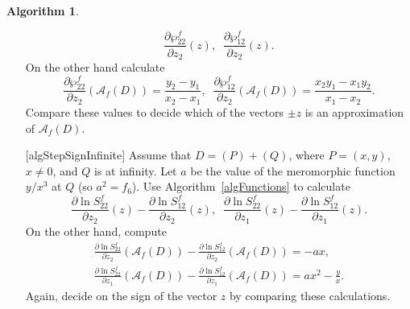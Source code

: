 \documentclass{amsart}
\numberwithin{equation}{section}
\theoremstyle{definition}
\newtheorem{algo}{Algorithm}[section]
\theoremstyle{remark}
\begin{document}
\begin{algo}
\begin{enumerate}
			\[
			\frac{\partial \wp_{22}^f}{\partial z_2}(z),\;\;\frac{\partial \wp_{12}^f}{\partial z_2}(z).
			\]
			On the other hand calculate
			\[
			\frac{\partial \wp_{22}^f}{\partial z_2}(\mathscr A_f(D)) = \frac{y_2 - y_1}{x_2 - x_1},\;\;\frac{\partial \wp_{12}^f}{\partial z_2}(\mathscr A_f(D)) = \frac{x_2 y_1 - x_1 y_2}{x_1 - x_2}.
			\]
			Compare these values to decide which of the vectors $\pm z$ is an approximation of $\mathscr A_f(D)$.
			\item[{\crtcrossreflabel{(\arabic{enumi}b)}[algStepSignInfinite]}] Assume that $D = (P) + (Q)$, where $P = (x,y)$, $x \ne 0$, and $Q$ is at infinity. Let $a$ be the value of the meromorphic function $y/x^3$ at $Q$ (so $a^2 = f_6$). Use Algorithm~\ref{algFunctions} to calculate
			\[
			\frac{\partial \ln S_{22}^f}{\partial z_2}(z) - \frac{\partial \ln S_{12}^f}{\partial z_2}(z),\;\;\frac{\partial \ln S_{22}^f}{\partial z_1}(z) - \frac{\partial \ln S_{12}^f}{\partial z_1}(z).
			\]
			On the other hand, compute
			\[
			\begin{gathered}
				\frac{\partial \ln S_{22}^f}{\partial z_2}(\mathscr A_f(D)) - \frac{\partial \ln S_{12}^f}{\partial z_2}(\mathscr A_f(D)) = -ax,\\ \frac{\partial \ln S_{22}^f}{\partial z_1}(\mathscr A_f(D)) - \frac{\partial \ln S_{12}^f}{\partial z_1}(\mathscr A_f(D)) = ax^2 - \frac{y}{x}.
			\end{gathered}
			\]
			Again, decide on the sign of the vector $z$ by comparing these calculations.
		\end{enumerate}
	\end{algo}
\end{document}
